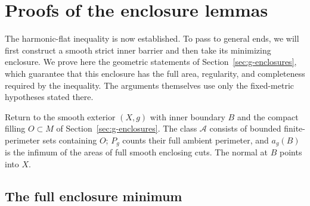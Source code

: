 \section{Proofs of the enclosure lemmas}
\label{sec:g-enclosure-proofs}

The harmonic-flat inequality is now established. To pass to general
ends, we will first construct a smooth strict inner barrier and then
take its minimizing enclosure. We prove here the geometric statements
of Section~\ref{sec:g-enclosures}, which guarantee that this enclosure
has the full area, regularity, and completeness required by the
inequality. The arguments themselves use only the fixed-metric
hypotheses stated there.

Return to the smooth exterior $(X,g)$ with inner boundary $B$ and
the compact filling $O\subset M$ of Section~\ref{sec:g-enclosures}.
The class $\mathcal A$ consists of bounded finite-perimeter sets
containing $O$; $P_g$ counts their full ambient perimeter, and
$a_g(B)$ is the infimum of the areas of full smooth enclosing cuts.
The normal at $B$ points into $X$.

\subsection{The full enclosure minimum}
\label{subsec:g-proof-enclosure}

